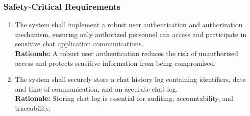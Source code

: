 \documentclass[]{article}
\begin{document}
\subsubsection{Safety-Critical Requirements}
\label{ssub:safety_critical_requirements}
\begin{enumerate}[{PR-SC}1. ]
    \item The system shall implement a robust user authentication and authorization mechanism, ensuring only authorized
    personnel can access and participate in sensitive chat application communications. \\
    {\bf Rationale:} A robust user authentication reduces the risk of unauthorized access and protects sensitive information
    from being compromised.
    \item The system shall securely store a chat history log containing identifiers, date and time of communication, and an accurate chat log.\\
    {\bf Rationale:} Storing chat log is essential for auditing, accountability, and traceability. \\
\end{enumerate}
\end{document}
